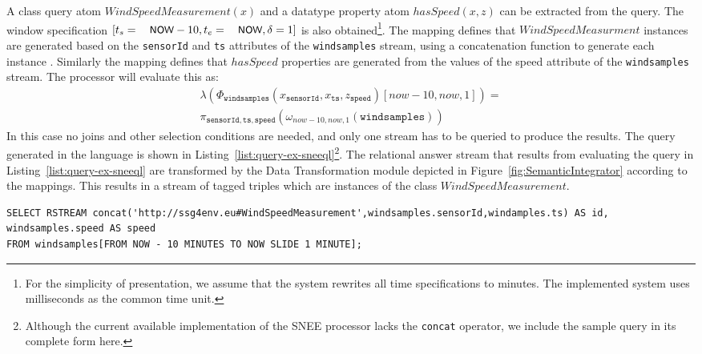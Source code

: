 A class query atom $WindSpeedMeasurement(x)$ and a datatype property atom $hasSpeed(x,z)$ can be extracted from the \sparqlstr query. 
The window specification $[t_s=\textsf{\small{NOW}}-10,t_e=\textsf{\small{NOW}},\delta=1]$ is also obtained\footnote{For the simplicity of presentation, we assume that the system rewrites all time specifications to minutes.
The implemented system uses milliseconds as the common time unit.}.
The \stwoo mapping defines that $WindSpeedMeasurment$ instances are generated based on the \texttt{sensorId} and \texttt{ts} attributes of the \texttt{windsamples} stream, using a concatenation function to generate each instance \uri.
Similarly the \stwoo mapping defines that $hasSpeed$ properties are generated from the values of the speed attribute of the \texttt{windsamples} stream. 
The processor will evaluate this as:
\begin{align*}
\lambda(\Phi_{\mathtt{windsamples}}(x_{\mathtt{sensorId}},x_{\mathtt{ts}},z_{\mathtt{speed}})[now-10,now,1]) = \\ \pi_{\mathtt{sensorId,ts,speed}}(\omega_{now-10,now,1} (\mathtt{windsamples}))
\end{align*}
In this case no joins and other selection conditions are needed, and only one stream has to be queried to produce the results. 
The query generated in the \sneeql language is shown in Listing~\ref{list:query-ex-sneeql}\footnote {Although the current available implementation of the SNEE processor lacks the \texttt{concat} operator, we include the sample query in its complete form here.}. The relational answer stream that results from evaluating the query in Listing~\ref{list:query-ex-sneeql} are transformed by the \textsf{Data Transformation} module depicted in Figure~\ref{fig:SemanticIntegrator} according to the \stwoo mappings.
This results in a stream of tagged triples which are instances of the class $WindSpeedMeasurement$.

\begin{lstlisting}[style=SNEEqlStyle,language=SNEEql,frame=none,float,label=list:query-ex-sneeql,caption=The \sneeql query that is generated for the input query in Listing~\ref{list:query-example}.]
SELECT RSTREAM concat('http://ssg4env.eu#WindSpeedMeasurement',windsamples.sensorId,windamples.ts) AS id, windsamples.speed AS speed
FROM windsamples[FROM NOW - 10 MINUTES TO NOW SLIDE 1 MINUTE];
\end{lstlisting}






